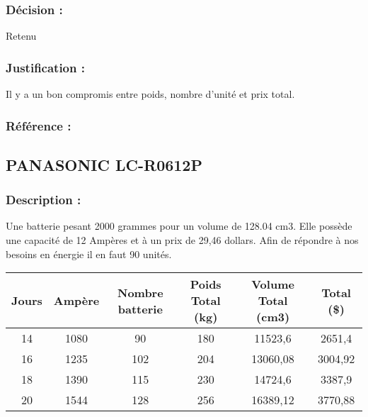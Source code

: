 \subsubsection{Décision :} 
Retenu
\subsubsection{Justification :} 
Il y a un bon compromis entre poids, nombre d’unité et prix total.
\subsubsection{Référence : } 

\subsection{PANASONIC LC-R0612P}
\subsubsection{Description :} 
Une batterie pesant 2000 grammes pour un volume de 128.04 cm3. Elle possède une capacité de 12 Ampères et à un prix de 29,46 dollars. Afin de répondre à nos besoins en énergie il en faut 90 unités.\\
\begin{table}[!hbtp]
\begin{tabular}{|c|c|c|c|c|c|}
\hline
Jours & Ampère & Nombre batterie & Poids Total (kg) & Volume Total (cm3) &  Total (\$) \\ \hline
14    & 1080   & 90                                                         & 180                                                         & 11523,6                                                       & 2651,4                                                     \\ \hline
16    & 1235   & 102                                                        & 204                                                         & 13060,08                                                      & 3004,92                                                    \\ \hline
18    & 1390   & 115                                                        & 230                                                         & 14724,6                                                       & 3387,9                                                     \\ \hline
20    & 1544   & 128                                                        & 256                                                         & 16389,12                                                      & 3770,88                                                    \\ \hline
\end{tabular}
\end{table}

